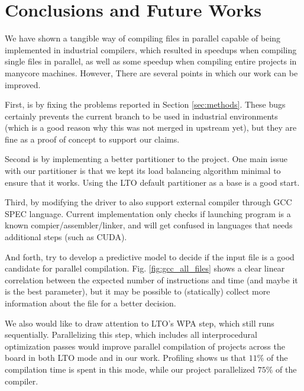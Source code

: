 \documentclass[runningheads]{llncs}
\begin{document}
\section{Conclusions and Future Works}\label{sec:future_works}

We have shown a tangible way of compiling files in parallel capable
of being implemented in industrial compilers, which resulted in
speedups when compiling single files in parallel, as well as some
speedup when compiling entire projects in manycore machines. However,
There are several points in which our work can be improved.

First, is by fixing the problems reported in Section \ref{sec:methods}. These bugs
certainly prevents the current branch to be used in industrial environments (which is a
good reason why this was not merged in upstream yet), but they are fine as a
proof of concept to support our claims.

Second is by implementing a better partitioner to the project. One main issue
with our partitioner is that we kept its load balancing algorithm minimal to
ensure that it works. Using the LTO default partitioner as a base is a good start.

Third, by modifying the driver to also support external compiler through GCC
SPEC language. Current implementation only checks if launching program
is a known compier/assembler/linker, and will get confused in languages that
needs additional steps (such as CUDA).

And forth, try to develop a predictive model to decide if the input file is
a good candidate for parallel compilation. Fig. \ref{fig:gcc_all_files} shows
a clear linear correlation between the expected number of instructions and time
(and maybe it is the best parameter), but it may be possible to (statically)
collect more information about the file for a better decision.

We also would like to draw attention to LTO's WPA step, which still runs
sequentially. Parallelizing this step, which includes all interprocedural
optimization passes would improve parallel compilation of projects across the
board in both LTO mode and in our work. Profiling shows us that $11\%$ of the
compilation time is spent in this mode, while our project parallelized $75\%$
of the compiler.
\end{document}
